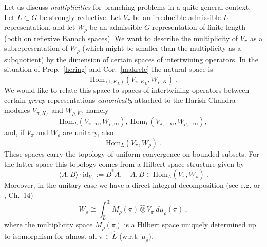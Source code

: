 \documentclass[10]{amsart}
\theoremstyle{remark}
\theoremstyle{definition}
\numberwithin{equation}{section}
\newcommand{\Hom}{\mathrm{Hom}}
\newcommand{\id}{\mathrm{id}}
\newcommand{\fl}{{\mathfrak l}}
\newcommand{\be}{\begin{equation}}
\newcommand{\defn}{{:=}}
\begin{document}
{Let us discuss {\em multiplicities} for branching problems in a quite general context. Let $L\subset G$ be strongly reductive.
Let $V_\pi$ be an irreducible admissible $L$-representation, and let $W_\rho$ be an admissible $G$-representation of finite length (both on reflexive Banach spaces). We want to describe the multiplicity of ${V_\pi}$ as a subrepresentation of $W_\rho$ (which might be smaller than the multiplicity as a subquotient) by the dimension of certain spaces of intertwining operators.
In the situation of Prop.~\ref{hering} and Cor.~\ref{makrele} the natural space is 
$$ \Hom_{(\fl,K_L)}(V_{\pi,K_L},W_{\rho,K})\ .$$
We would like to relate this space to spaces of intertwining operators between certain {\em group} representations {\em canonically} attached to the Harish-Chandra modules $V_{\pi,K_L}$ and $W_{\rho,K}$, namely
$$  \Hom_{L}(V_{\pi,\infty},W_{\rho,\infty}),\  \Hom_{L}(V_{\pi,-\infty},W_{\rho,-\infty}), $$
and, if $V_\pi$ and $W_\rho$ are unitary, also
$$ \Hom_{L}(V_{\pi},W_{\rho})\ .$$
These spaces carry the topology of uniform convergence on bounded subsets. For the latter space this topology comes from a Hilbert space structure given by 
\be\label{cezanne} \langle A, B\rangle\cdot\id_{V_\pi}\defn  B^*A,\quad A,B\in  \Hom_{L}(V_{\pi},W_{\rho})\ .
\end{equation}
Moreover, in the unitary case we have a direct integral decomposition (see e.g. \cite{Di} or \cite{Wa92}, Ch.~14)
\begin{equation}\label{lachs}  W_\rho\cong \int^\oplus_{\widehat L} M_\rho(\pi)\hat\otimes V_\pi\:  d\mu_\rho(\pi)\ ,\end{equation}
where the multiplicity space $M_\rho(\pi)$ is a Hilbert space uniquely determined up to isomorphism for almost all  $\pi\in \widehat L$ (w.r.t. $\mu_\rho$).

}
\end{document}
